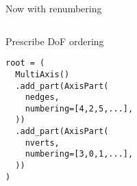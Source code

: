 \documentclass{beamer}
\newcommand{\checked}{\makebox[0pt][l]{$\square$}\raisebox{.15ex}{\hspace{0.1em}$\checkmark$}}
\begin{document}
\begin{frame}[fragile]{Now with renumbering}
\begin{columns}
    \hfill

    \begin{column}{.5\textwidth}
      \checked Prescribe DoF ordering

      \vspace{2em}

      \begin{verbatim}
root = (
  MultiAxis()
  .add_part(AxisPart(
    nedges,
    numbering=[4,2,5,...],
  ))
  .add_part(AxisPart(
    nverts,
    numbering=[3,0,1,...],
  ))
)
      \end{verbatim}
    \end{column}
  \end{columns}
\end{frame}
\end{document}
